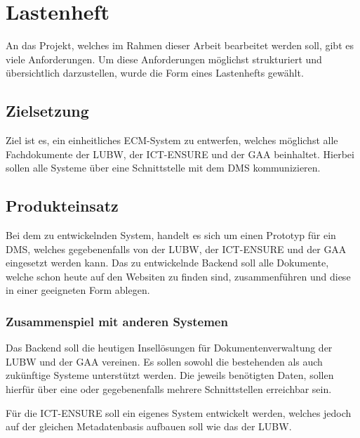 \section{Lastenheft} \label{Lastenheft}
An das Projekt, welches im Rahmen dieser Arbeit bearbeitet werden soll, gibt es viele Anforderungen. Um diese Anforderungen m\"oglichst strukturiert und \"ubersichtlich darzustellen, wurde die Form eines Lastenhefts gew\"ahlt.

\subsection{Zielsetzung} \label{Zielsetzung}
Ziel ist es, ein einheitliches \ac{ECM}-System zu entwerfen, welches m\"oglichst alle Fachdokumente der \ac{LUBW}, der \ac{ICT-ENSURE} und der \ac{GAA} beinhaltet.
Hierbei sollen alle Systeme \"uber eine Schnittstelle mit dem \ac{DMS} kommunizieren.

\subsection{Produkteinsatz} \label{Produkteinsatz}
Bei dem zu entwickelnden System, handelt es sich um einen Prototyp f\"ur ein \ac{DMS}, welches gegebenenfalls von der \ac{LUBW}, der \ac{ICT-ENSURE} und der \ac{GAA} eingesetzt werden kann. Das zu entwickelnde Backend soll alle Dokumente, welche schon heute auf den Websiten zu finden sind, zusammenf\"uhren und diese in einer geeigneten Form ablegen.

\subsubsection{Zusammenspiel mit anderen Systemen} \label{Zusammenspiel mit anderen Systemen}
Das Backend soll die heutigen Insell\"osungen f\"ur Dokumentenverwaltung der \ac{LUBW} und der \ac{GAA} vereinen. Es sollen sowohl die bestehenden als auch zuk\"unftige Systeme unterst\"utzt werden. Die jeweils ben\"otigten Daten, sollen hierf\"ur \"uber eine oder gegebenenfalls mehrere Schnittstellen erreichbar sein.

F\"ur die \ac{ICT-ENSURE} soll ein eigenes System entwickelt werden, welches jedoch auf der gleichen Metadatenbasis aufbauen soll wie das der \ac{LUBW}.

